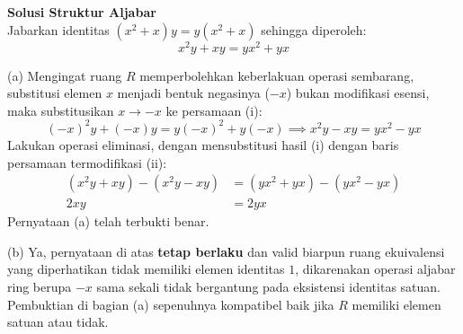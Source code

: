 \documentclass{article}
\begin{document}
\vspace{0.5cm}

\textbf{Solusi Struktur Aljabar} \\
Jabarkan identitas $(x^2+x)y = y(x^2+x)$ sehingga diperoleh:
\[ x^2y + xy = yx^2 + yx \tag{i} \]

(a) Mengingat ruang $R$ memperbolehkan keberlakuan operasi sembarang, substitusi elemen $x$ menjadi bentuk negasinya ($-x$) bukan modifikasi esensi, maka substitusikan $x \to -x$ ke persamaan (i):
\[ (-x)^2y + (-x)y = y(-x)^2 + y(-x) \implies x^2y - xy = yx^2 - yx \tag{ii} \]
Lakukan operasi eliminasi, dengan mensubstitusi hasil (i) dengan baris persamaan termodifikasi (ii):
\begin{align*}
  (x^2y + xy) - (x^2y - xy) & = (yx^2 + yx) - (yx^2 - yx) \\
  2xy                       & = 2yx
\end{align*}
Pernyataan (a) telah terbukti benar.

(b) Ya, pernyataan di atas \textbf{tetap berlaku} dan valid biarpun ruang ekuivalensi yang diperhatikan tidak memiliki elemen identitas $1$, dikarenakan operasi aljabar ring berupa $-x$ sama sekali tidak bergantung pada eksistensi identitas satuan. Pembuktian di bagian (a) sepenuhnya kompatibel baik jika $R$ memiliki elemen satuan atau tidak.
\end{document}

